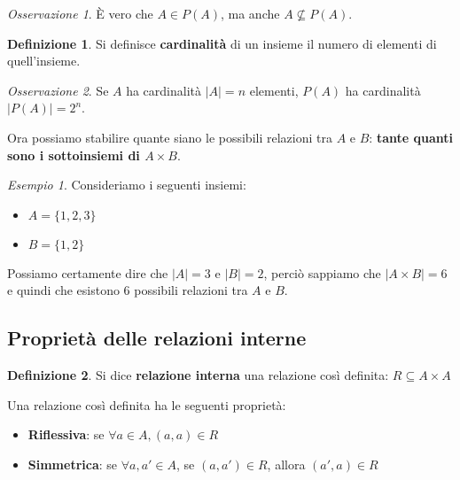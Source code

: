 \documentclass[a4paper, 12pt]{report}
\theoremstyle{definition}
\newtheorem{definition}{Definizione}[chapter]
\theoremstyle{remark}
\newtheorem{example}{Esempio}[definition]
\newtheorem{remark}{Osservazione}[definition]
\theoremstyle{plain}
\begin{document}
\begin{remark}
    È vero che $A \in P(A)$, ma anche $A \nsubseteq P(A)$.
\end{remark}

\begin{definition}
    Si definisce \textbf{cardinalità} di un insieme il numero di elementi di quell'insieme.
\end{definition}

\begin{remark}
    Se $A$ ha cardinalità $|A| = n$ elementi, $P(A)$ ha cardinalità $|P(A)| = 2^n$.
\end{remark}

Ora possiamo stabilire quante siano le possibili relazioni tra $A$ e $B$: \textbf{tante quanti sono i sottoinsiemi di $A \times B$}.

\begin{example}
    Consideriamo i seguenti insiemi:
    \begin{itemize}
        \item $A = \{1, 2, 3\}$
        \item $B = \{1, 2\}$
    \end{itemize}
    Possiamo certamente dire che $|A| = 3$ e $|B| = 2$, perciò sappiamo che $|A \times B| = 6$ e quindi che esistono 6 possibili relazioni tra $A$ e $B$.
\end{example}

\subsection{Proprietà delle relazioni interne}

\begin{definition}
    Si dice \textbf{relazione interna} una relazione così definita: $R \subseteq A \times A$
\end{definition}

Una relazione così definita ha le seguenti proprietà:
\begin{itemize}
    \item \textbf{Riflessiva}: se $\forall a \in A, (a, a) \in R$
    \item \textbf{Simmetrica}: se $\forall a, a' \in A$, se $(a, a') \in R$, allora $(a', a) \in R$
\end{itemize}
\end{document}
